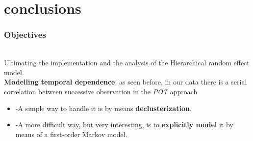 \documentclass[usenames,dvipsnames]{beamer}
\begin{document}
\section{conclusions}
\begin{frame}
\frametitle{Objectives}
\\

Ultimating the implementation and the analysis of the Hierarchical random effect model.\\
\vspace{8pt}
\textbf{Modelling temporal dependence}: as seen before, in our data there is a serial correlation between successive observation in the \textit{POT} approach %
\\
\begin{itemize}
    \item -A simple way to handle it is by means \textbf{declusterization}.
    \item -A more difficult way, but very interesting, is to \textbf{explicitly model} it by means of a first-order Markov model. %
    
    
\end{itemize}


\end{frame}



\end{document}
